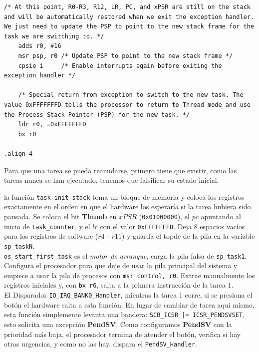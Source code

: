 \documentclass[12pt,letterpaper]{article}
\begin{document}
\begin{lstlisting}[style=modernc, caption={\texttt{pendsv.s}}]
    /* At this point, R0-R3, R12, LR, PC, and xPSR are still on the stack and will be automatically restored when we exit the exception handler. We just need to update the PSP to point to the new stack frame for the task we are switching to. */
    adds r0, #16 
    msr psp, r0 /* Update PSP to point to the new stack frame */
    cpsie i     /* Enable interrupts again before exiting the exception handler */

    /* Special return from exception to switch to the new task. The value 0xFFFFFFFD tells the processor to return to Thread mode and use the Process Stack Pointer (PSP) for the new task. */
    ldr r0, =0xFFFFFFFD
    bx r0

.align 4
\end{lstlisting}

\bigskip

Para que una tarea se pueda reanudarse, primero tiene que existir, como las tareas nunca se han ejecutado, tenemos que falsificar su estado inicial.

\noindent
la función \texttt{task\_init\_stack} toma un bloque de memoria y coloca los registros exactamente en el orden en que el hardware los esperaría si la tarea hubiera sido pausada. Se coloca el bit \textbf{Thumb} en $xPSR$ (\texttt{0x01000000}), el $pc$ apuntando al inicio de \texttt{task\_counter}, y el $lr$ con el valor \texttt{0xFFFFFFFD}. Deja 8 espacios vacíos para los registros de software ($r4$ - $r11$) y guarda el topde de la pila  en la variable \texttt{sp\_taskN}.\\

\noindent
\texttt{os\_start\_first\_task} es el \textit{motor de arranque}, carga la pila falsa de \texttt{sp\_task1}. Configura el procesador para que deje de usar la pila principal del sistema y empiece a usar la pila de procesos con \texttt{msr control, r0}. Extrae manualmente los registros iniciales y, con \texttt{bx r6}, salta a la primera instrucción de la tarea 1.\\

\noindent
El Disparador \texttt{IO\_IRQ\_BANK0\_Handler}, mientras la tarea 1 corre, si se presiona el botón el hardware salta a esta función. En lugar de cambiar de tarea aquí mismo, esta función simplemente levanta una bandera: \texttt{SCB\_ICSR |= ICSR\_PENDSVSET}, esto solicita una excepción \textbf{PendSV}. Como configuramos \textbf{PendSV} con la prioridad más baja, el procesador termina de atender el botón, verifica si hay otras urgencias, y como no las hay, dispara el \texttt{PendSV\_Handler}.\\
\end{document}
